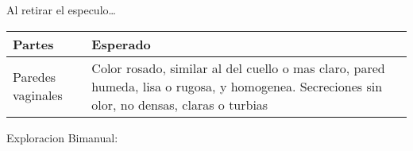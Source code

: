 \documentclass[
]{article}
\begin{document}
Al retirar el especulo\ldots{}

\begin{longtable}[]{@{}ll@{}}
\toprule
\begin{minipage}[b]{0.64\columnwidth}\raggedright
Partes\strut
\end{minipage} & \begin{minipage}[b]{0.30\columnwidth}\raggedright
Esperado\strut
\end{minipage}\tabularnewline
\midrule
\endhead
\begin{minipage}[t]{0.64\columnwidth}\raggedright
Paredes vaginales\strut
\end{minipage} & \begin{minipage}[t]{0.30\columnwidth}\raggedright
Color rosado, similar al del cuello o mas claro, pared humeda, lisa o
rugosa, y homogenea. Secreciones sin olor, no densas, claras o
turbias\strut
\end{minipage}\tabularnewline
\bottomrule
\end{longtable}

Exploracion Bimanual:
\end{document}
